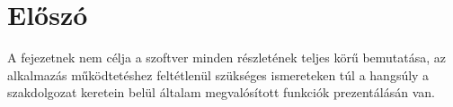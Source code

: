 \section{Előszó}

A fejezetnek nem célja a szoftver minden részletének teljes körű bemutatása, az
alkalmazás működtetéshez feltétlenül szükséges ismereteken túl a hangsúly a
szakdolgozat keretein belül általam megvalósított funkciók prezentálásán van.
